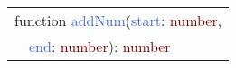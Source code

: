 \scriptsize\begin{tabular}[t]{>{\ttfamily}l}
\textcolor{myrose}{function} \textcolor{RoyalBlue}{addNum}(\textcolor{RoyalBlue}{start}: \textcolor{Maroon}{number},\\
\ \ \textcolor{RoyalBlue}{end}: \textcolor{Maroon}{number}): \textcolor{Maroon}{number}
\end{tabular}